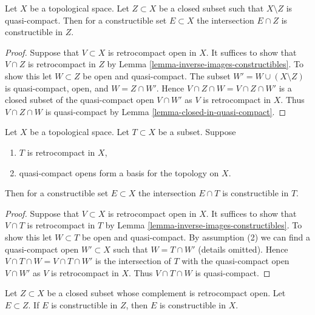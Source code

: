 \begin{lemma}
\label{lemma-intersect-constructible-with-closed}
Let $X$ be a topological space. Let $Z \subset X$ be a closed
subset such that $X \setminus Z$ is quasi-compact.
Then for a constructible set $E \subset X$ the intersection
$E \cap Z$ is constructible in $Z$.
\end{lemma}

\begin{proof}
Suppose that $V \subset X$ is retrocompact open in $X$.
It suffices to show that $V \cap Z$ is retrocompact in $Z$
by Lemma \ref{lemma-inverse-images-constructibles}. To show this
let $W \subset Z$ be open and quasi-compact. The subset
$W' = W \cup (X \setminus Z)$ is quasi-compact, open, and $W = Z \cap W'$.
Hence $V \cap Z \cap W = V \cap Z \cap W'$
is a closed subset of the quasi-compact open $V \cap W'$
as $V$ is retrocompact in $X$. Thus $V \cap Z \cap W$ is quasi-compact
by Lemma \ref{lemma-closed-in-quasi-compact}.
\end{proof}

\begin{lemma}
\label{lemma-intersect-constructible-with-retrocompact}
Let $X$ be a topological space. Let $T \subset X$ be a subset. Suppose
\begin{enumerate}
\item $T$ is retrocompact in $X$,
\item quasi-compact opens form a basis for the topology on $X$.
\end{enumerate}
Then for a constructible set $E \subset X$ the intersection $E \cap T$ is
constructible in $T$.
\end{lemma}

\begin{proof}
Suppose that $V \subset X$ is retrocompact open in $X$.
It suffices to show that $V \cap T$ is retrocompact in $T$
by Lemma \ref{lemma-inverse-images-constructibles}. To show this
let $W \subset T$ be open and quasi-compact. By assumption (2)
we can find a quasi-compact open $W' \subset X$
such that $W = T \cap W'$ (details omitted).
Hence $V \cap T \cap W = V \cap T \cap W'$
is the intersection of $T$ with  the quasi-compact open $V \cap W'$
as $V$ is retrocompact in $X$. Thus $V \cap T \cap W$ is quasi-compact.
\end{proof}

\begin{lemma}
\label{lemma-closed-constructible-image}
Let $Z \subset X$ be a closed subset whose complement is retrocompact open.
Let $E \subset Z$. If $E$ is constructible in $Z$, then $E$ is constructible
in $X$.
\end{lemma}

